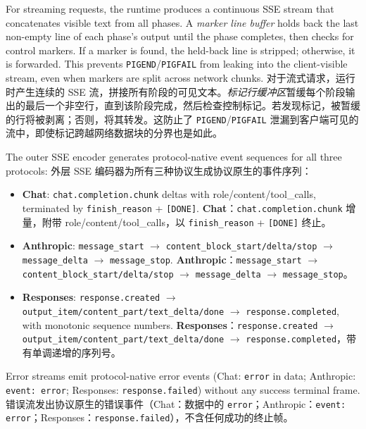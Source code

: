 For streaming requests, the runtime produces a continuous SSE stream that concatenates visible text from all phases. A \emph{marker line buffer} holds back the last non-empty line of each phase's output until the phase completes, then checks for control markers. If a marker is found, the held-back line is stripped; otherwise, it is forwarded. This prevents \texttt{PIGEND}/\texttt{PIGFAIL} from leaking into the client-visible stream, even when markers are split across network chunks.
对于流式请求，运行时产生连续的 SSE 流，拼接所有阶段的可见文本。\emph{标记行缓冲区}暂缓每个阶段输出的最后一个非空行，直到该阶段完成，然后检查控制标记。若发现标记，被暂缓的行将被剥离；否则，将其转发。这防止了 \texttt{PIGEND}/\texttt{PIGFAIL} 泄漏到客户端可见的流中，即使标记跨越网络数据块的分界也是如此。

The outer SSE encoder generates protocol-native event sequences for all three protocols:
外层 SSE 编码器为所有三种协议生成协议原生的事件序列：
\begin{itemize}[nosep]
    \item \textbf{Chat}: \texttt{chat.completion.chunk} deltas with role/content/tool\_calls, terminated by \texttt{finish\_reason} + \texttt{[DONE]}.
    \textbf{Chat}：\texttt{chat.completion.chunk} 增量，附带 role/content/tool\_calls，以 \texttt{finish\_reason} + \texttt{[DONE]} 终止。
    \item \textbf{Anthropic}: \texttt{message\_start} $\rightarrow$ \texttt{content\_block\_start/delta/stop} $\rightarrow$ \texttt{message\_delta} $\rightarrow$ \texttt{message\_stop}.
    \textbf{Anthropic}：\texttt{message\_start} $\rightarrow$ \texttt{content\_block\_start/delta/stop} $\rightarrow$ \texttt{message\_delta} $\rightarrow$ \texttt{message\_stop}。
    \item \textbf{Responses}: \texttt{response.created} $\rightarrow$ \texttt{output\_item/content\_part/text\_delta/done} $\rightarrow$ \texttt{response.completed}, with monotonic sequence numbers.
    \textbf{Responses}：\texttt{response.created} $\rightarrow$ \texttt{output\_item/content\_part/text\_delta/done} $\rightarrow$ \texttt{response.completed}，带有单调递增的序列号。
\end{itemize}

Error streams emit protocol-native error events (Chat: \texttt{error} in data; Anthropic: \texttt{event: error}; Responses: \texttt{response.failed}) without any success terminal frame.
错误流发出协议原生的错误事件（Chat：数据中的 \texttt{error}；Anthropic：\texttt{event: error}；Responses：\texttt{response.failed}），不含任何成功的终止帧。
